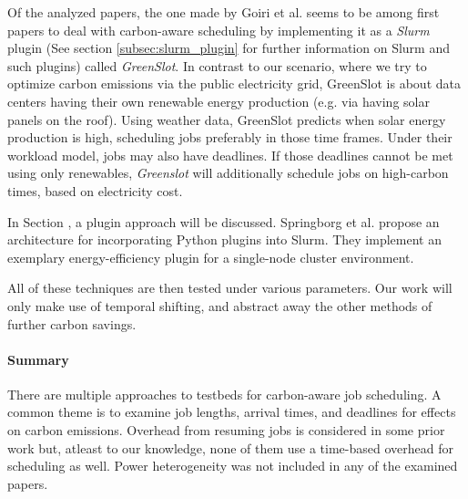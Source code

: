 Of the analyzed papers, the one made by Goiri et al. \cite{inigo_goiri_greenslot_2011} seems to be among first papers to deal with carbon-aware scheduling by implementing it as a \emph{Slurm} plugin (See section \ref{subsec:slurm_plugin} for further information on Slurm and such plugins) called \emph{GreenSlot}.
In contrast to our scenario, where we try to optimize carbon emissions via the public electricity grid, GreenSlot is about data centers having their own renewable energy production (e.g. via having solar panels on the roof). 
Using weather data, GreenSlot predicts when solar energy production is high, scheduling jobs preferably in those time frames.
Under their workload model, jobs may also have deadlines.
If those deadlines cannot be met using only renewables, \emph{Greenslot} will additionally schedule jobs on high-carbon times, based on electricity cost.

In Section \label{subsec:slurm_plugin}, a plugin approach will be discussed. Springborg et al. \cite{aaen_springborg_automatic_2023} propose an architecture for incorporating Python plugins into Slurm. 
They implement an exemplary energy-efficiency plugin for a single-node cluster environment. 

All of these techniques are then tested under various parameters. Our work will only make use of temporal shifting, and abstract away the other methods of further carbon savings.

\paragraph{Summary}
There are multiple approaches to testbeds for carbon-aware job scheduling. A common theme is to examine job lengths, arrival times, and deadlines for effects on carbon emissions. Overhead from resuming jobs is considered in some prior work but, atleast to our knowledge, none of them use a time-based overhead for scheduling as well. Power heterogeneity was not included in any of the examined papers.